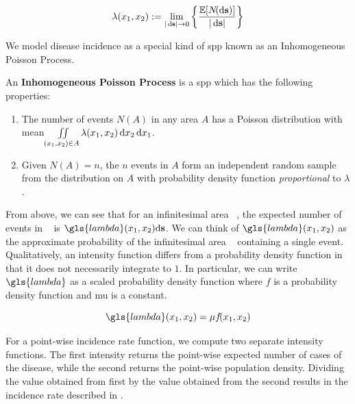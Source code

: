 \begin{equation}
    \label{eq:lambda_differential}
    \lambda \xvec := \lim_{|\ds| \to 0}
        \left\{
            \frac{\mathbb{E}[N\!(\ds)]}%
            {|\ds|}
        \right\}
\end{equation}

We model disease incidence as a special kind of \gls{spp} known as an Inhomogeneous Poisson Process.
\begin{defn}
    \label{defn:inhomogenouspoissonprocess}
    An \textbf{Inhomogeneous Poisson Process} is a \gls{spp} which has the following properties:
    \begin{enumerate}
        \item The number of events $N(A)$ in any area $A$ has a Poisson distribution with mean $\iint\limits_{(x_1, x_2) \in A}{\lambda (x_1, x_2) \mathop{}\!\mathrm{d}{x_2} \mathop{}\!\mathrm{d}{x_1}}$.
        \item Given $N(A) = n$,
            the $n$ events in $A$ form an independent random sample from the distribution on $A$ with probability density function \textit{proportional} to $\lambda$.
    \end{enumerate}
\end{defn}

From above, we can see that for an infinitesimal area \ds~,
the expected number of events in \ds~ is $\gls{lambda}\xvec \! \ds$.
We can think of $\gls{lambda}\xvec$ as the approximate probability of the infinitesimal area \ds~ containing a single \gls{event}.
Qualitatively, an intensity function differs from a probability density function in that it does not necessarily integrate to $1$.
In particular, we can write $\gls{lambda}$ as a scaled probability density function
where $f$ is a probability density function and \gls{mu} is a constant.

\begin{equation}
    \label{eq:lambda_mu}
    \gls{lambda}\xvec = \mu f\!\xvec
\end{equation}

For a point-wise \gls{incidence rate} function,
we compute two separate \gls{intensity} functions.
The first \gls{intensity} returns the point-wise expected number of cases of the disease,
while the second returns the point-wise population density.
Dividing the value obtained from first by the value obtained from the second results in the \gls{incidence rate} described in .

